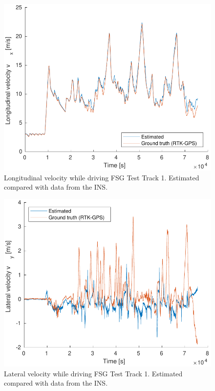 \begin{figure}
    \centering
    \includegraphics[width=0.8\linewidth]{0_Images/6_Results/vxFSGTestTrack.pdf}
    \caption[Longitudinal velocity while driving FSG Test Track 1.]
    {Longitudinal velocity while driving FSG Test Track 1. Estimated compared with data from the INS.}
    \label{Fig:VxFSGTestTrack}
\end{figure}

\begin{figure}
    \centering
    \includegraphics[width=0.8\linewidth]{0_Images/6_Results/vyFSGTestTrack.pdf}
    \caption[Lateral velocity while driving FSG Test Track 1.]
    {Lateral velocity  while driving FSG Test Track 1. Estimated compared with data from the INS.}
    \label{Fig:VyFSGTestTrack}
\end{figure}

